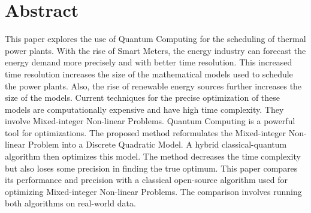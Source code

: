 \section*{Abstract}

This paper explores the use of Quantum Computing for the scheduling of thermal power plants.
With the rise of Smart Meters, the energy industry can forecast the energy demand more precisely and with better time resolution.
This increased time resolution increases the size of the mathematical models used to schedule the power plants.
Also, the rise of renewable energy sources further increases the size of the models.
Current techniques for the precise optimization of these models are computationally expensive and have high time complexity.
They involve Mixed-integer Non-linear Problems.
Quantum Computing is a powerful tool for optimizations.
The proposed method reformulates the Mixed-integer Non-linear Problem into a Discrete Quadratic Model.
A hybrid classical-quantum algorithm then optimizes this model.
The method decreases the time complexity but also loses some precision in finding the true optimum.
This paper compares its performance and precision with a classical open-source algorithm used for optimizing Mixed-integer Non-linear Problems.
The comparison involves running both algorithms on real-world data.
